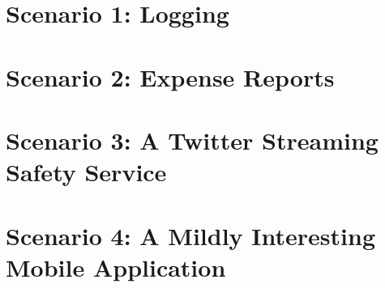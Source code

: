 \documentclass[12pt, letterpaper]{homework}
\author{Bradford Smith}
\title{}
\date{\today}
\begin{document}
\maketitle

\section*{Scenario 1: Logging}

\section*{Scenario 2: Expense Reports}

\section*{Scenario 3: A Twitter Streaming Safety Service}

\section*{Scenario 4: A Mildly Interesting Mobile Application}
\end{document}
